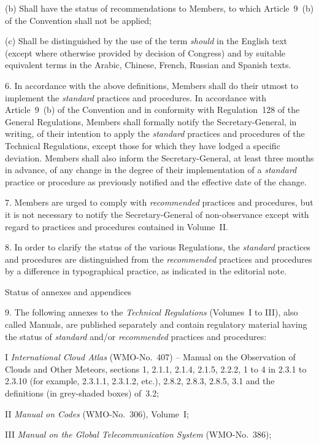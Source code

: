 (b) Shall have the status of recommendations to Members, to which Article~9~(b) of the Convention shall not be applied;

(c) Shall be distinguished by the use of the term \emph{should} in the English text (except where otherwise provided by decision of Congress) and by suitable equivalent terms in the Arabic, Chinese, French, Russian and Spanish texts.

6. In accordance with the above definitions, Members shall do their utmost to implement the \emph{standard} practices and procedures. In accordance with Article~9~(b) of the Convention and in conformity with Regulation~128 of the General Regulations, Members shall formally notify the Secretary-General, in writing, of their intention to apply the \emph{standard} practices and procedures of the Technical Regulations, except those for which they have lodged a specific deviation. Members shall also inform the Secretary-General, at least three months in advance, of any change in the degree of their implementation of a \emph{standard} practice or procedure as previously notified and the effective date of the change.

7. Members are urged to comply with \emph{recommended} practices and procedures, but it is not necessary to notify the Secretary-General of non-observance except with regard to practices and procedures contained in Volume~II.

8. In order to clarify the status of the various Regulations, the \emph{standard} practices and procedures are distinguished from the \emph{recommended} practices and procedures by a difference in typographical practice, as indicated in the editorial note.

Status of annexes and appendices

9. The following annexes to the \emph{Technical Regulations} (Volumes~I to III), also called Manuals, are published separately and contain regulatory material having the status of \emph{standard} and/or \emph{recommended} practices and procedures:

I \emph{International Cloud Atlas} (WMO-No.~407) -- Manual on the Observation of Clouds and Other Meteors, sections 1, 2.1.1, 2.1.4, 2.1.5, 2.2.2, 1 to 4 in 2.3.1 to 2.3.10 (for example, 2.3.1.1, 2.3.1.2, etc.), 2.8.2, 2.8.3, 2.8.5, 3.1 and the definitions (in grey-shaded boxes) of~3.2;

II \emph{Manual on Codes} (WMO-No.~306), Volume~I;

III \emph{Manual on the Global Telecommunication System} (WMO-No.~386);

